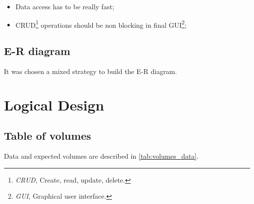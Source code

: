 \documentclass[12pt, a4paper]{report}
\begin{document}
\begin{itemize}
    \item Data access has to be really fast;
    \item CRUD\footnote{\emph{CRUD}, Create, read, update, delete.} operations should be non blocking in final
        GUI\footnote{\emph{GUI}, Graphical user interface.};
\end{itemize}

\subsection*{E-R diagram}

It was chosen a mixed strategy to build the E-R diagram.



\section*{Logical Design}

\subsection*{Table of volumes}

Data and expected volumes are described in \autoref{tab:volumes_data}.
\end{document}
